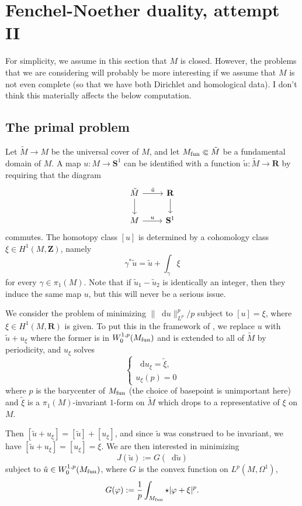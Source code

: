 \documentclass[reqno,12pt]{amsart}
\newcommand{\ZZ}{\mathbf{Z}}
\newcommand{\RR}{\mathbf{R}}
\newcommand{\Sph}{\mathbf S}
\newcommand*\dif{\mathop{}\!\mathrm{d}}
\theoremstyle{definition}
\numberwithin{equation}{section}
\begin{document}
\section{Fenchel-Noether duality, attempt II}
For simplicity, we assume in this section that $M$ is closed.
However, the problems that we are considering will probably be more interesting if we assume that $M$ is not even complete (so that we have both Dirichlet and homological data).
I don't think this materially affects the below computation.

\subsection{The primal problem}
Let $\tilde M \to M$ be the universal cover of $M$, and let $M_{\rm fun} \Subset \tilde M$ be a fundamental domain of $M$.
A map $u: M \to \Sph^1$ can be identified with a function $\tilde u: \tilde M \to \RR$ by requiring that the diagram
$$\begin{tikzcd}\tilde M \arrow[r, "\tilde u"] \arrow[d] & \RR \arrow[d] \\ M \arrow[r, "u"] & \Sph^1\end{tikzcd}$$
commutes.
The homotopy class $[u]$ is determined by a cohomology class $\xi \in H^1(M, \ZZ)$, namely 
$$\gamma^* \tilde u = \tilde u + \int_\gamma \xi$$
for every $\gamma \in \pi_1(M)$.
Note that if $\tilde u_1 - \tilde u_2$ is identically an integer, then they induce the same map $u$, but this will never be a serious issue.

We consider the problem of minimizing $\|\dif u\|_{L^p}^p/p$ subject to $[u] = \xi$, where $\xi \in H^1(M, \RR)$ is given.
To put this in the framework of \cite{Ekeland99}, we replace $u$ with $\tilde u + u_\xi$ where the former is in $W^{1, p}_0(M_{\rm fun})$ and is extended to all of $\tilde M$ by periodicity, and $u_\xi$ solves 
$$\begin{cases}
\dif u_\xi = \tilde \xi, \\
u_\xi(p) = 0
\end{cases}$$
where $p$ is the barycenter of $M_{\rm fun}$ (the choice of basepoint is unimportant here) and $\tilde \xi$ is a $\pi_1(M)$-invariant $1$-form on $\tilde M$ which drops to a representative of $\xi$ on $M$.

Then $[\tilde u + u_\xi] = [\tilde u] + [u_\xi]$, and since $\tilde u$ was construed to be invariant, we have $[\tilde u + u_\xi] = [u_\xi] = \xi$.
We are then interested in minimizing 
$$J(\tilde u) := G(\dif \tilde u)$$
subject to $\tilde u \in W^{1, p}_0(M_{\rm fun})$, where $G$ is the convex function on $L^p(M, \Omega^1)$,
$$G(\varphi) := \frac{1}{p} \int_{M_{\rm fun}} \star |\varphi + \xi|^p.$$
\end{document}
